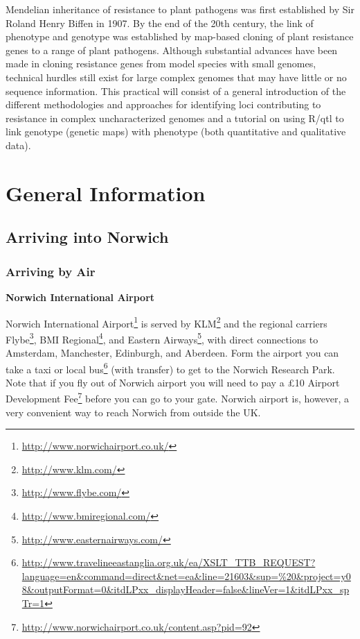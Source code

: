 \documentclass[12pt,]{book}
\let\rmarkdownfootnote\footnote%
\def\footnote{\protect\rmarkdownfootnote}
\renewcommand{\href}[2]{#2\footnote{\url{#1}}}
\theoremstyle{definition}
\theoremstyle{definition}
\theoremstyle{remark}
\begin{document}
Mendelian inheritance of resistance to plant pathogens was first
established by Sir Roland Henry Biffen in 1907. By the end of the 20th
century, the link of phenotype and genotype was established by map-based
cloning of plant resistance genes to a range of plant pathogens.
Although substantial advances have been made in cloning resistance genes
from model species with small genomes, technical hurdles still exist for
large complex genomes that may have little or no sequence information.
This practical will consist of a general introduction of the different
methodologies and approaches for identifying loci contributing to
resistance in complex uncharacterized genomes and a tutorial on using
R/qtl to link genotype (genetic maps) with phenotype (both quantitative
and qualitative data).

\chapter*{General Information}\label{general-information}

\section*{Arriving into Norwich}\label{arriving-into-norwich}

\subsection*{Arriving by Air}\label{arriving-by-air}

\textbf{Norwich International Airport}

\href{http://www.norwichairport.co.uk/}{Norwich International Airport}
is served by \href{http://www.klm.com/}{KLM} and the regional carriers
\href{http://www.flybe.com/}{Flybe},
\href{http://www.bmiregional.com/}{BMI Regional}, and
\href{http://www.easternairways.com/}{Eastern Airways}, with direct
connections to Amsterdam, Manchester, Edinburgh, and Aberdeen. Form the
airport you can take a taxi or
\href{http://www.travelineeastanglia.org.uk/ea/XSLT_TTB_REQUEST?language=en\&command=direct\&net=ea\&line=21603\&sup=\%20\&project=y08\&outputFormat=0\&itdLPxx_displayHeader=false\&lineVer=1\&itdLPxx_spTr=1}{local
bus} (with transfer) to get to the Norwich Research Park. Note that if
you fly out of Norwich airport you will need to pay a
\href{http://www.norwichairport.co.uk/content.asp?pid=92}{£10 Airport
Development Fee} before you can go to your gate. Norwich airport is,
however, a very convenient way to reach Norwich from outside the UK.
\end{document}
